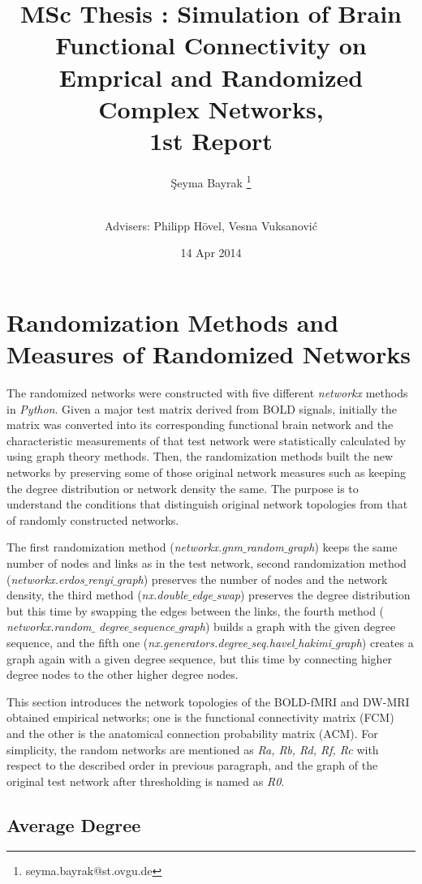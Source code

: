 \documentclass[12pt]{article}
\title{MSc Thesis : Simulation of Brain Functional Connectivity on Emprical and Randomized Complex Networks, \\ 1st Report}
\author[1]{\c{S}eyma Bayrak \thanks{seyma.bayrak@st.ovgu.de}}
\author[ ]{\\ Advisers: Philipp H\"{o}vel, Vesna Vuksanovi\'c}
\affil[1]{\footnotesize{Integrative Neuroscience MSc, Otto von Guericke University, Magdeburg}}
\date{14 Apr 2014}
\begin{document}
   \maketitle
   

	\section{Randomization Methods and Measures of Randomized Networks}	
	
The randomized networks were constructed with five different \textit{networkx} methods in \textit{Python}. Given a major test matrix derived from BOLD signals, initially the matrix was converted into its corresponding functional brain network and the characteristic measurements of that test network were statistically calculated by using graph theory methods. Then, the randomization methods built the new networks by preserving some of those original network measures such as keeping the degree distribution or network density the same. The purpose is to understand the conditions that distinguish original network topologies from that of randomly constructed networks.  

The first randomization method (\textit{networkx.gnm$\_$random$\_$graph}) keeps the same number of nodes and links as in the test network, second randomization method (\textit{networkx.erdos$\_$renyi$\_$graph}) preserves the number of nodes and the network density, the third method (\textit{nx.double$\_$edge$\_$swap}) preserves the degree distribution but this time by swapping the edges between the links, the fourth method ( \textit{networkx.random$\_$} \textit{degree$\_$sequence$\_$graph}) builds a graph with the given degree sequence, and the fifth one (\textit{nx.generators.degree$\_$seq.havel$\_$hakimi$\_$graph}) creates a graph again with a given degree sequence, but this time by connecting higher degree nodes to the other higher degree nodes.
	
This section introduces the network topologies of the BOLD-fMRI and DW-MRI obtained empirical networks; one is the functional connectivity matrix (FCM) and the other is the anatomical connection probability matrix (ACM). For simplicity, the random networks are mentioned as \textit{Ra, Rb, Rd, Rf, Rc} with respect to the described order in previous paragraph, and the graph of the original test network after thresholding is named as \textit{R0}.  	

\subsection{Average Degree}
\end{document}

